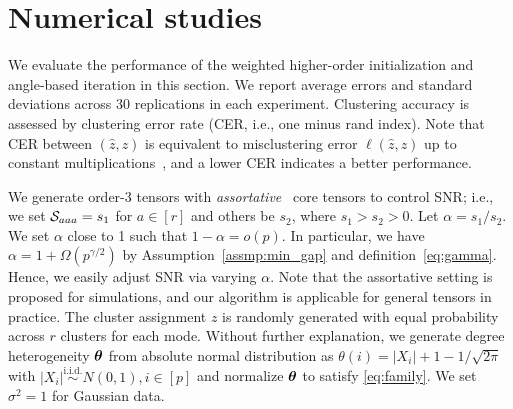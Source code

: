 \documentclass[lettersize,journal]{IEEEtran}
\theoremstyle{definition}
\theoremstyle{definition}
\newcommand{\of}[1]{\left(#1\right)}
\def\fixme#1#2{\textbf{\color{red}[FIXME (#1): #2]}}
\begin{document}







\section{Numerical studies}\label{sec:simulation}

 We evaluate the performance of the weighted higher-order initialization and angle-based iteration in this section. We report average errors and standard deviations across 30 replications in each experiment. Clustering accuracy is assessed by clustering error rate (CER, i.e., one minus rand index). Note that CER between $(\hat z, z)$ is equivalent to misclustering error $\ell(\hat z, z)$ up to constant multiplications~\citep{meilua2012local}, and a lower CER indicates a better performance.

We generate order-3 tensors with \emph{assortative}~\citep{gao2018community} core tensors to control SNR; i.e., we set $\mathcal{S}_{aaa} = s_1$ for $a \in [r]$ and others be $s_2$, where $s_1 > s_2 > 0$. Let $\alpha = s_1/s_2$. We set $\alpha$ close to 1 such that $1-\alpha=o(p)$. In particular, we have $\alpha = 1 + \Omega(p^{\gamma/2})$ %
  by Assumption~\ref{assmp:min_gap} and definition~\eqref{eq:gamma}.
  Hence, we easily adjust SNR via varying $\alpha$. 
 Note that the assortative setting is proposed for simulations, and our algorithm is applicable for general tensors in practice. The cluster assignment $z$ is randomly generated with equal probability across  $r$ clusters for each mode. Without further explanation, we generate degree heterogeneity $\boldsymbol{\theta}$ from absolute normal distribution as $\theta(i) = |X_i| + 1 - 1/\sqrt{2\pi}$ with $|X_i| \stackrel{\text{i.i.d.}}\sim N(0,1), i \in [p]$ and normalize $\boldsymbol{\theta}$ to satisfy \eqref{eq:family}. We set $\sigma^2 = 1$ for Gaussian data. 
\end{document}
